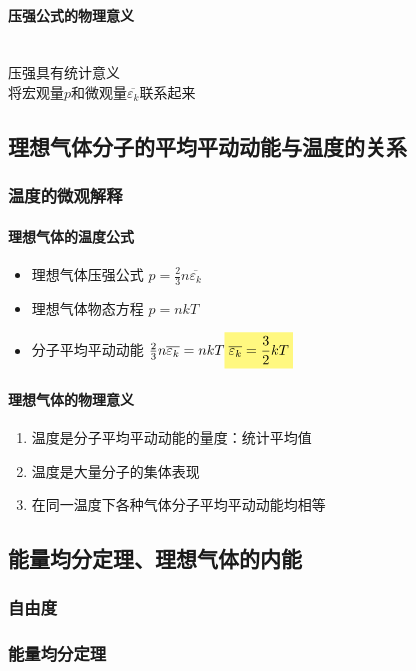 \documentclass[UTF8,a4paper,12pt,scheme=chinese]{ctexart}
\newcommand{\hla}[1]{%
	\colorbox{yellow!50}{$\displaystyle#1$}}
\begin{document}
	\paragraph{压强公式的物理意义}~{}\\
	压强具有统计意义\\
	将宏观量$p$和微观量$\overline{\varepsilon_k}$联系起来
	\subsection{理想气体分子的平均平动动能与温度的关系}
	\subsubsection{温度的微观解释}
	\paragraph{理想气体的温度公式}
	\begin{itemize}
		\item 理想气体压强公式 $p=\frac{2}{3}n\overline{\varepsilon_k}$
		\item 理想气体物态方程 $p=nkT$
		\item 分子平均平动动能 $\frac{2}{3}n\overline{\varepsilon_k} = nkT\\
		\hla{\overline{\varepsilon_k} = \frac{3}{2}kT}$
	\end{itemize}
	\paragraph{理想气体的物理意义}
	\begin{enumerate}
		\item 温度是分子平均平动动能的量度：统计平均值
		\item 温度是大量分子的集体表现
		\item 在同一温度下各种气体分子平均平动动能均相等
	\end{enumerate}
	\subsection{能量均分定理、理想气体的内能}
	\subsubsection{自由度}
	\subsubsection{能量均分定理}
\end{document}
